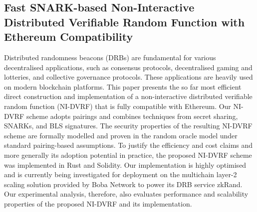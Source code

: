 \documentclass[11pt]{article}
\theoremstyle{definition}
\theoremstyle{remark}
\theoremstyle{plain}
\begin{document}
\subsection{\cite{10.1145/3708821.3710835} Fast SNARK-based Non-Interactive Distributed Verifiable Random Function with Ethereum Compatibility}
Distributed randomness beacons (DRBs) are fundamental for various decentralised applications, such as consensus protocols, decentralised gaming and lotteries, and collective governance protocols. These applications are heavily used on modern blockchain platforms. This paper presents the so far most efficient direct construction and implementation of a non-interactive distributed verifiable random function (NI-DVRF) that is fully compatible with Ethereum. Our NI-DVRF scheme adopts pairings and combines techniques from secret sharing, SNARKs, and BLS signatures. The security properties of the resulting NI-DVRF scheme are formally modelled and proven in the random oracle model under standard pairing-based assumptions. To justify the efficiency and cost claims and more generally its adoption potential in practice, the proposed NI-DVRF scheme was implemented in Rust and Solidity. Our implementation is highly optimised and is currently being investigated for deployment on the multichain layer-2 scaling solution provided by Boba Network to power its DRB service zkRand. Our experimental analysis, therefore, also evaluates performance and scalability properties of the proposed NI-DVRF and its implementation.
\end{document}
